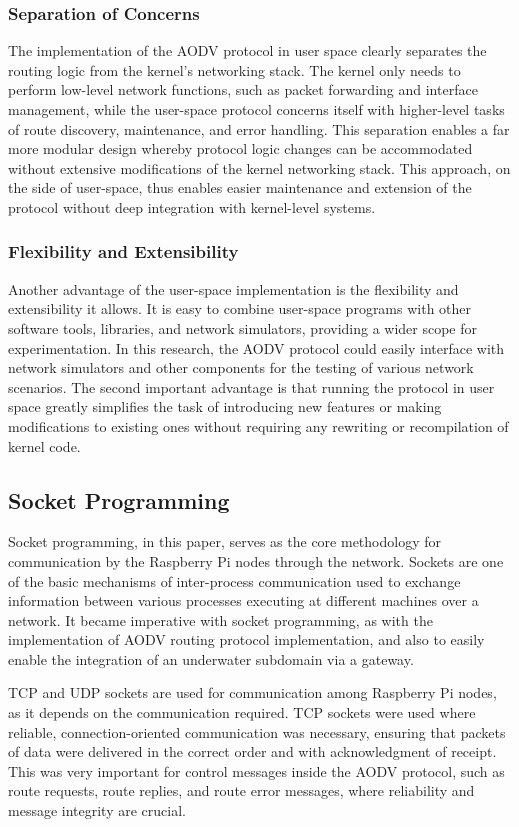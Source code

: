 \documentclass[]{nsm-thesis}
\begin{document}
\subsubsection{Separation of Concerns}
The implementation of the AODV protocol in user space clearly separates the routing logic from the kernel's networking stack. The kernel only needs to perform low-level network functions, such as packet forwarding and interface management, while the user-space protocol concerns itself with higher-level tasks of route discovery, maintenance, and error handling. This separation enables a far more modular design whereby protocol logic changes can be accommodated without extensive modifications of the kernel networking stack. This approach, on the side of user-space, thus enables easier maintenance and extension of the protocol without deep integration with kernel-level systems.
\subsubsection{Flexibility and Extensibility}
Another advantage of the user-space implementation is the flexibility and extensibility it allows. It is easy to combine user-space programs with other software tools, libraries, and network simulators, providing a wider scope for experimentation. In this research, the AODV protocol could easily interface with network simulators and other components for the testing of various network scenarios. The second important advantage is that running the protocol in user space greatly simplifies the task of introducing new features or making modifications to existing ones without requiring any rewriting or recompilation of kernel code.
\subsection{Socket Programming}
Socket programming, in this paper, serves as the core methodology for communication by the Raspberry Pi nodes through the network. Sockets are one of the basic mechanisms of inter-process communication used to exchange information between various processes executing at different machines over a network. It became imperative with socket programming, as with the implementation of AODV routing protocol implementation, and also to easily enable the integration of an underwater subdomain via a gateway.

TCP and UDP sockets are used for communication among Raspberry Pi nodes, as it depends on the communication required. TCP sockets were used where reliable, connection-oriented communication was necessary, ensuring that packets of data were delivered in the correct order and with acknowledgment of receipt. This was very important for control messages inside the AODV protocol, such as route requests, route replies, and route error messages, where reliability and message integrity are crucial.
\end{document}
